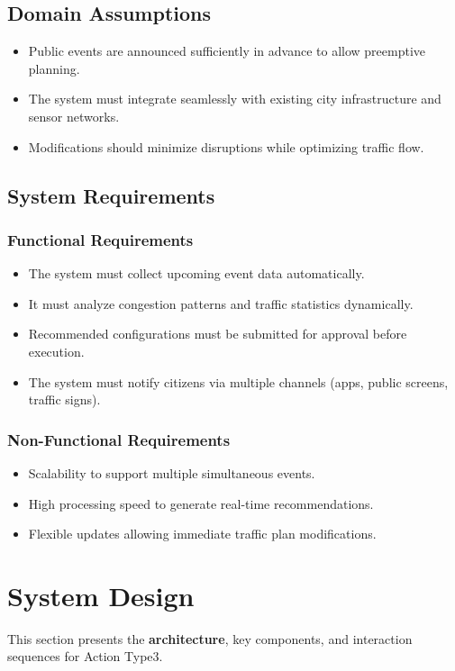 \documentclass[a4paper,12pt]{article}
\begin{document}
\subsection{Domain Assumptions}
\begin{itemize}
    \item Public events are announced sufficiently in advance to allow preemptive planning.
    \item The system must integrate seamlessly with existing city infrastructure and sensor networks.
    \item Modifications should minimize disruptions while optimizing traffic flow.
\end{itemize}

\subsection{System Requirements}
\subsubsection{Functional Requirements}
\begin{itemize}
    \item The system must collect upcoming event data automatically.
    \item It must analyze congestion patterns and traffic statistics dynamically.
    \item Recommended configurations must be submitted for approval before execution.
    \item The system must notify citizens via multiple channels (apps, public screens, traffic signs).
\end{itemize}

\subsubsection{Non-Functional Requirements}
\begin{itemize}
    \item Scalability to support multiple simultaneous events.
    \item High processing speed to generate real-time recommendations.
    \item Flexible updates allowing immediate traffic plan modifications.
\end{itemize}

\clearpage

\section{System Design}
This section presents the \textbf{architecture}, key components, and interaction sequences for Action Type3.
\end{document}
